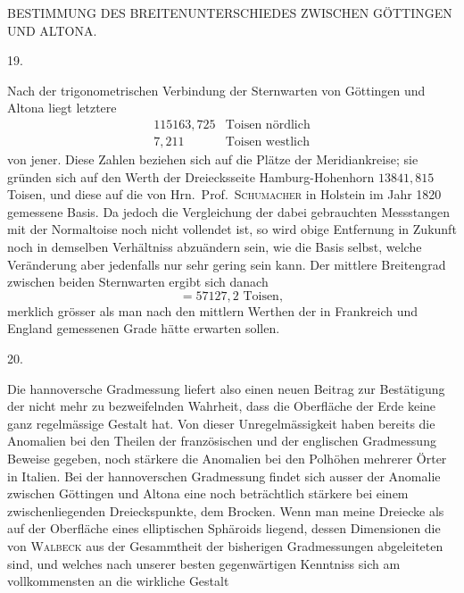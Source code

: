 \clearpage
\noindent{}\parbox[t]{\dimexpr\textwidth-10mm\relax}{\centering\scriptsize BESTIMMUNG DES BREITENUNTERSCHIEDES ZWISCHEN GÖTTINGEN UND ALTONA.}\par
\begin{center}19.\end{center}
Nach der trigonometrischen Verbindung der Sternwarten von Göttingen und Altona liegt letztere
\[
\begin{array}{rl}
115163{,}725&\text{Toisen nördlich}\\
7{,}211&\text{Toisen westlich}
\end{array}
\]
von jener. Diese Zahlen beziehen sich auf die Plätze der Meridiankreise; sie gründen sich auf den Werth der Dreiecksseite Hamburg-Hohenhorn $13841{,}815$ Toisen, und diese auf die von Hrn.\ Prof.\ \textsc{Schumacher} in Holstein im Jahr 1820 gemessene Basis. Da jedoch die Vergleichung der dabei gebrauchten Messstangen mit der Normaltoise noch nicht  vollendet ist, so wird obige Entfernung in Zukunft noch in demselben Verhältniss abzuändern sein, wie die Basis selbst, welche Veränderung aber jedenfalls nur sehr gering sein kann. Der mittlere Breitengrad zwischen beiden Sternwarten ergibt sich danach
\[
=57127{,}2\text{ Toisen},
\]
merklich grösser als man nach den mittlern Werthen der in Frankreich und England gemessenen Grade hätte erwarten sollen.
\begin{center}20.\end{center}
Die hannoversche Gradmessung liefert also einen neuen Beitrag zur Bestätigung der nicht mehr zu bezweifelnden Wahrheit, dass die Oberfläche der Erde keine ganz regelmässige Gestalt hat. Von dieser Unregelmässigkeit haben bereits die Anomalien bei den Theilen der französischen und der englischen Gradmessung Beweise gegeben, noch stärkere die Anomalien bei den Polhöhen mehrerer Örter in Italien. Bei der hannoverschen Gradmessung findet sich ausser der Anomalie zwischen Göttingen und Altona eine noch beträchtlich stärkere bei einem zwischenliegenden Dreieckspunkte, dem Brocken. Wenn man meine Dreiecke als auf der Oberfläche eines elliptischen Sphäroids liegend, dessen Dimensionen die von \textsc{Walbeck} aus der Gesammtheit der bisherigen Gradmessungen abgeleiteten sind, und welches nach unserer besten gegenwärtigen Kenntniss sich am vollkommensten an die wirkliche Gestalt

